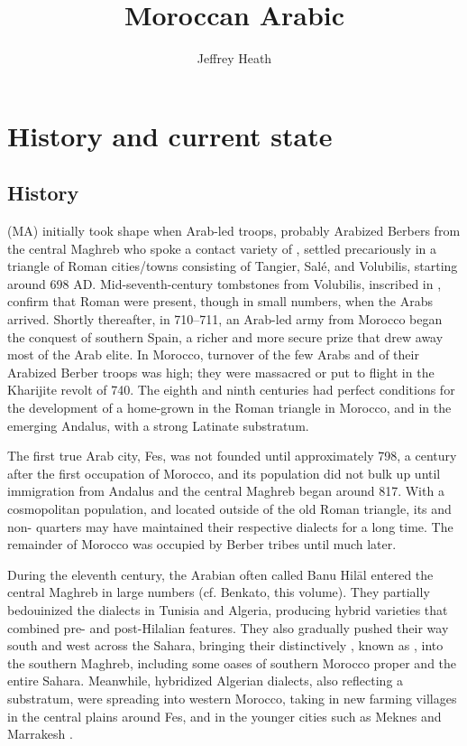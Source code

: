 \documentclass[output=paper]{langsci/langscibook}
\title{Moroccan Arabic}
\author{Jeffrey Heath\affiliation{University of Michigan}}
\begin{document}
\section{History and current state}

\subsection{History}

 (MA) initially took shape when Arab-led troops, probably Arabized Berbers from the central Maghreb who spoke a contact variety of , settled precariously in a triangle of Roman cities/towns consisting of Tangier, Salé, and Volubilis, starting around 698 AD. Mid-seventh-century tombstones from Volubilis, inscribed in , confirm that Roman  were present, though in small numbers, when the Arabs arrived. Shortly thereafter, in 710–711, an Arab-led army from Morocco began the conquest of southern Spain, a richer and more secure prize that drew away most of the Arab elite. In Morocco, turnover of the few Arabs and of their Arabized Berber troops was high; they were massacred or put to flight in the Kharijite revolt of 740. The eighth and ninth centuries had perfect conditions for the development of a home-grown  in the Roman triangle in Morocco, and in the emerging Andalus, with a strong Latinate substratum.  

The first true Arab city, Fes, was not founded until approximately 798, a century after the first occupation of Morocco, and its population did not bulk up until immigration from Andalus and the central Maghreb began around 817. With a cosmopolitan population, and located outside of the old Roman triangle, its  and non- quarters may have maintained their respective dialects for a long time. The remainder of Morocco was occupied by Berber tribes until much later.

During the eleventh century, the Arabian  often called Banu Hilāl entered the central Maghreb in large numbers (cf. Benkato, this volume). They partially bedouinized the  dialects in Tunisia and Algeria, producing hybrid varieties that combined pre- and post-Hilalian features. They also gradually pushed their way south and west across the Sahara, bringing their distinctively  , known as , into the southern Maghreb, including some oases of southern Morocco proper and the entire  Sahara. Meanwhile, hybridized Algerian dialects, also reflecting a  substratum, were spreading into western Morocco, taking  in new farming villages in the central plains around Fes, and in the younger cities such as Meknes and Marrakesh \citep{Heath2002}.
\end{document}
